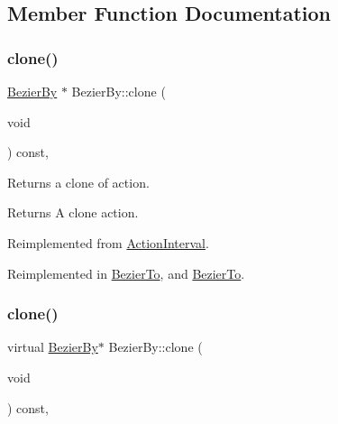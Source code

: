 \subsection{Member Function Documentation}
\mbox{\label{classBezierBy_a38e476c4def21766d8592a864813dcfe}} 
\subsubsection{\texorpdfstring{clone()}{clone()}\hspace{0.1cm}{\footnotesize\ttfamily [1/2]}}
{\footnotesize\ttfamily \hyperlink{classBezierBy}{Bezier\+By} $\ast$ Bezier\+By\+::clone (\begin{DoxyParamCaption}\item[{void}]{ }\end{DoxyParamCaption}) const\hspace{0.3cm}{\ttfamily [override]}, {\ttfamily [virtual]}}

Returns a clone of action.

\begin{DoxyReturn}{Returns}
A clone action. 
\end{DoxyReturn}


Reimplemented from \hyperlink{classActionInterval_abc93ce0c2f54a90eb216a7803f25f44a}{Action\+Interval}.



Reimplemented in \hyperlink{classBezierTo_a3cb15fbd6d2b9038ab3f25608765d54a}{Bezier\+To}, and \hyperlink{classBezierTo_ace522cd65d274c3f0a77c7925a2f12d5}{Bezier\+To}.

\mbox{\label{classBezierBy_a23998a4d8a7df8df06a00decd6e3b38b}} 
\subsubsection{\texorpdfstring{clone()}{clone()}\hspace{0.1cm}{\footnotesize\ttfamily [2/2]}}
{\footnotesize\ttfamily virtual \hyperlink{classBezierBy}{Bezier\+By}$\ast$ Bezier\+By\+::clone (\begin{DoxyParamCaption}\item[{void}]{ }\end{DoxyParamCaption}) const\hspace{0.3cm}{\ttfamily [override]}, {\ttfamily [virtual]}}

